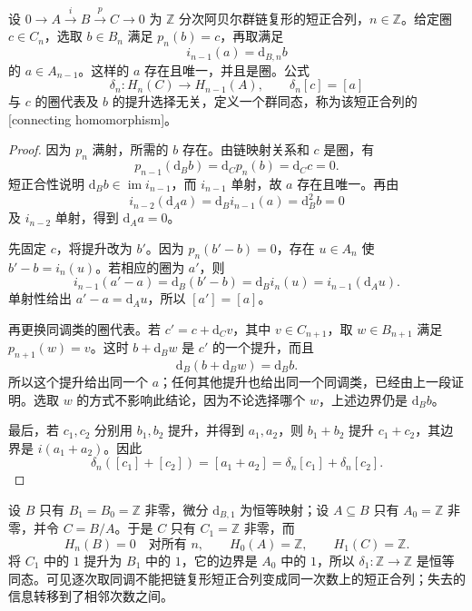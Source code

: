 \begin{proposition}\label{g2:prop:connecting-map}
	设 \(0\to A\xrightarrow{i}B\xrightarrow{p}C\to0\) 为 \(\mathbb Z\) 分次阿贝尔群链复形的短正合列，\(n\in\mathbb Z\)。给定圈 \(c\in C_n\)，选取 \(b\in B_n\) 满足 \(p_n(b)=c\)，再取满足
	\[
		i_{n-1}(a)=\mathrm{d}_{B,n}b
	\]
	的 \(a\in A_{n-1}\)。这样的 \(a\) 存在且唯一，并且是圈。公式
	\[
		\delta_n:H_n(C)\longrightarrow H_{n-1}(A),\qquad
		\delta_n[c]=[a]
	\]
	与 \(c\) 的圈代表及 \(b\) 的提升选择无关，定义一个群同态，称为该短正合列的[connecting homomorphism]。
\end{proposition}
\begin{proof}
	因为 \(p_n\) 满射，所需的 \(b\) 存在。由链映射关系和 \(c\) 是圈，有
	\[
		p_{n-1}(\mathrm{d}_Bb)=\mathrm{d}_Cp_n(b)=\mathrm{d}_Cc=0.
	\]
	短正合性说明 \(\mathrm{d}_Bb\in\operatorname{im}i_{n-1}\)，而 \(i_{n-1}\) 单射，故 \(a\) 存在且唯一。再由
	\[
		i_{n-2}(\mathrm{d}_Aa)
		=\mathrm{d}_Bi_{n-1}(a)=\mathrm{d}_B^2b=0
	\]
	及 \(i_{n-2}\) 单射，得到 \(\mathrm{d}_Aa=0\)。

	先固定 \(c\)，将提升改为 \(b'\)。因为 \(p_n(b'-b)=0\)，存在 \(u\in A_n\) 使 \(b'-b=i_n(u)\)。若相应的圈为 \(a'\)，则
	\[
		i_{n-1}(a'-a)=\mathrm{d}_B(b'-b)
		=\mathrm{d}_Bi_n(u)=i_{n-1}(\mathrm{d}_Au).
	\]
	单射性给出 \(a'-a=\mathrm{d}_Au\)，所以 \([a']=[a]\)。

	再更换同调类的圈代表。若 \(c'=c+\mathrm{d}_Cv\)，其中 \(v\in C_{n+1}\)，取 \(w\in B_{n+1}\) 满足 \(p_{n+1}(w)=v\)。这时 \(b+\mathrm{d}_Bw\) 是 \(c'\) 的一个提升，而且
	\[
		\mathrm{d}_B(b+\mathrm{d}_Bw)=\mathrm{d}_Bb.
	\]
	所以这个提升给出同一个 \(a\)；任何其他提升也给出同一个同调类，已经由上一段证明。选取 \(w\) 的方式不影响此结论，因为不论选择哪个 \(w\)，上述边界仍是 \(\mathrm{d}_Bb\)。

	最后，若 \(c_1,c_2\) 分别用 \(b_1,b_2\) 提升，并得到 \(a_1,a_2\)，则 \(b_1+b_2\) 提升 \(c_1+c_2\)，其边界是 \(i(a_1+a_2)\)。因此
	\[
		\delta_n([c_1]+[c_2])=[a_1+a_2]
		=\delta_n[c_1]+\delta_n[c_2].
	\]
\end{proof}

\begin{example}\label{g2:exm:connecting-identity}
	设 \(B\) 只有 \(B_1=B_0=\mathbb Z\) 非零，微分 \(\mathrm{d}_{B,1}\) 为恒等映射；设 \(A\subseteq B\) 只有 \(A_0=\mathbb Z\) 非零，并令 \(C=B/A\)。于是 \(C\) 只有 \(C_1=\mathbb Z\) 非零，而
	\[
		H_n(B)=0\quad\text{对所有 }n,\qquad
		H_0(A)=\mathbb Z,\qquad H_1(C)=\mathbb Z.
	\]
	将 \(C_1\) 中的 \(1\) 提升为 \(B_1\) 中的 \(1\)，它的边界是 \(A_0\) 中的 \(1\)，所以 \(\delta_1:\mathbb Z\to\mathbb Z\) 是恒等同态。可见逐次取同调不能把链复形短正合列变成同一次数上的短正合列；失去的信息转移到了相邻次数之间。
\end{example}

